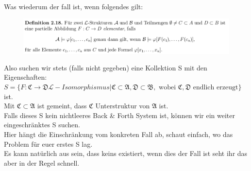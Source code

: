 \documentclass[a4paper]{scrartcl}
\begin{document}
    Was wiederum der fall ist, wenn folgendes gilt:

    \begin{figure}[H]
        \centering
        \includegraphics[scale=0.3]{./B&F-E.png}
        \label{fig:}
    \end{figure}

    Also suchen wir stets (falls nicht gegeben) eine Kollektion S mit den Eigenschaften:\\

    $S = \{F: \mathfrak{C} \rightarrow \mathfrak{D} \mathscr{L}-Isomorphismus| \mathfrak{C} \subset \mathfrak{A}, \mathfrak{D} \subset \mathfrak{B},
    \text{ wobei  }\mathfrak{C}, \mathfrak{D} \text{ endlich erzeugt}\}$ ist.\\
    Mit $\mathfrak{C} \subset \mathfrak{A}$ ist gemeint, dass $\mathfrak{C}$ Unterstruktur von $\mathfrak{A}$ ist.\\

    Falls dieses S kein nichtleeres Back \& Forth System ist, können wir ein weiter eingeschränktes S suchen.\\
    Hier hängt die Einschränkung vom konkreten Fall ab, schaut einfach, wo das Problem für euer erstes S lag.\\
    Es kann natürlich aus sein, dass keins existiert, wenn dies der Fall ist seht ihr das aber in der Regel schnell.\\
\end{document}
